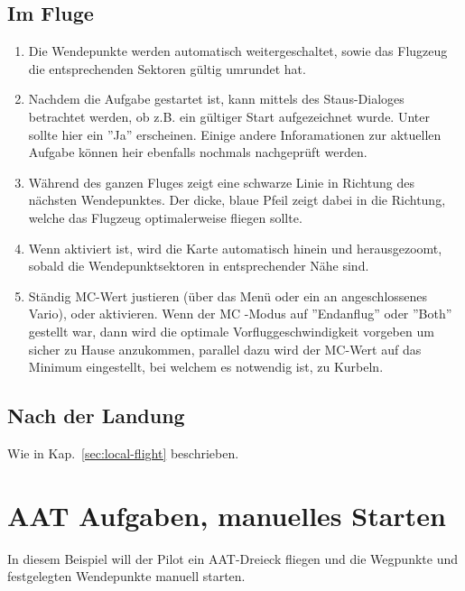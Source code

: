 \subsection*{Im Fluge}
\begin{enumerate}
\item  Die Wendepunkte werden automatisch weitergeschaltet, sowie das Flugzeug die entsprechenden
Sektoren gültig umrundet hat.
\item Nachdem die Aufgabe  gestartet ist, kann  mittels des Staus-Dialoges betrachtet werden, ob z.B. ein
gültiger Start aufgezeichnet wurde.
Unter  sollte hier ein  ''Ja'' erscheinen.
Einige andere Inforamationen zur aktuellen Aufgabe können heir ebenfalls nochmals nachgeprüft werden.
\item Während des ganzen Fluges zeigt eine schwarze Linie in Richtung des nächsten Wendepunktes.
Der dicke, blaue Pfeil zeigt dabei in die Richtung, welche das Flugzeug optimalerweise fliegen sollte.
\item  Wenn  aktiviert ist, wird die Karte automatisch hinein und herausgezoomt,
sobald die Wendepunktsektoren in entsprechender Nähe sind.
\item  Ständig MC-Wert justieren (über das Menü oder ein an \xc angeschlossenes Vario), oder  aktivieren.
Wenn der MC -Modus auf ''Endanflug'' oder ''Both'' gestellt war, dann wird \xc die optimale
Vorfluggeschwindigkeit vorgeben um sicher zu Hause anzukommen, parallel dazu wird der MC-Wert auf
das Minimum eingestellt, bei welchem es notwendig ist, zu Kurbeln.
\end{enumerate}

\subsection*{Nach der Landung}
Wie in Kap.~\ref{sec:local-flight} beschrieben.


\section{AAT Aufgaben, manuelles Starten}\label{sec:aat-task-manual}

In diesem Beispiel will der Pilot ein AAT-Dreieck fliegen und die Wegpunkte
und festgelegten Wendepunkte manuell starten.

